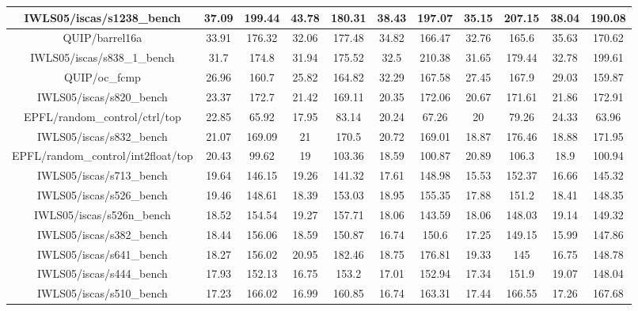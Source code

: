 {\begin{longtable}{|*{11}{c|}}
        \hline
        IWLS05/iscas/s1238\_bench & 37.09 & 199.44 & 43.78 & 180.31 & 38.43 & 197.07 & 35.15 & 207.15 & 38.04 & 190.08 \\
        \hline
        QUIP/barrel16a & 33.91 & 176.32 & 32.06 & 177.48 & 34.82 & 166.47 & 32.76 & 165.6 & 35.63 & 170.62 \\
        \hline
        IWLS05/iscas/s838\_1\_bench & 31.7 & 174.8 & 31.94 & 175.52 & 32.5 & 210.38 & 31.65 & 179.44 & 32.78 & 199.61 \\
        \hline
        QUIP/oc\_fcmp & 26.96 & 160.7 & 25.82 & 164.82 & 32.29 & 167.58 & 27.45 & 167.9 & 29.03 & 159.87 \\
        \hline
        IWLS05/iscas/s820\_bench & 23.37 & 172.7 & 21.42 & 169.11 & 20.35 & 172.06 & 20.67 & 171.61 & 21.86 & 172.91 \\
        \hline
        EPFL/random\_control/ctrl/top & 22.85 & 65.92 & 17.95 & 83.14 & 20.24 & 67.26 & 20 & 79.26 & 24.33 & 63.96 \\
        \hline
        IWLS05/iscas/s832\_bench & 21.07 & 169.09 & 21 & 170.5 & 20.72 & 169.01 & 18.87 & 176.46 & 18.88 & 171.95 \\
        \hline
        EPFL/random\_control/int2float/top & 20.43 & 99.62 & 19 & 103.36 & 18.59 & 100.87 & 20.89 & 106.3 & 18.9 & 100.94 \\
        \hline
        IWLS05/iscas/s713\_bench & 19.64 & 146.15 & 19.26 & 141.32 & 17.61 & 148.98 & 15.53 & 152.37 & 16.66 & 145.32 \\
        \hline
        IWLS05/iscas/s526\_bench & 19.46 & 148.61 & 18.39 & 153.03 & 18.95 & 155.35 & 17.88 & 151.2 & 18.41 & 148.35 \\
        \hline
        IWLS05/iscas/s526n\_bench & 18.52 & 154.54 & 19.27 & 157.71 & 18.06 & 143.59 & 18.06 & 148.03 & 19.14 & 149.32 \\
        \hline
        IWLS05/iscas/s382\_bench & 18.44 & 156.06 & 18.59 & 150.87 & 16.74 & 150.6 & 17.25 & 149.15 & 15.99 & 147.86 \\
        \hline
        IWLS05/iscas/s641\_bench & 18.27 & 156.02 & 20.95 & 182.46 & 18.75 & 176.81 & 19.33 & 145 & 16.75 & 148.78 \\
        \hline
        IWLS05/iscas/s444\_bench & 17.93 & 152.13 & 16.75 & 153.2 & 17.01 & 152.94 & 17.34 & 151.9 & 19.07 & 148.04 \\
        \hline
        IWLS05/iscas/s510\_bench & 17.23 & 166.02 & 16.99 & 160.85 & 16.74 & 163.31 & 17.44 & 166.55 & 17.26 & 167.68 \\

\end{longtable}}

